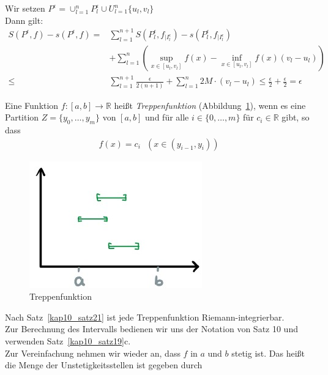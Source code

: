 \begin{Satz}
{	Wir setzen $P^{\epsilon} = \cup_{l = 1}^n P_l^{\epsilon}
	 \cup U_{l=1}^n\{u_l,v_l\}$\\
	 Dann gilt:
	 \begin{align*}
	 	S(P^{\epsilon},f) - s(P^{\epsilon},f) 
	 	= & \sum_{l=1}^{n+1} S(P_l^{\epsilon},f_{|I_l^{\epsilon}}) - 
	 		s(P_l^{\epsilon},f_{|I_l^{\epsilon}})  \\
	 		& + \sum_{l = 1}^n \left( \sup_{x \in [u_l, v_l]} 
	 		f(x) - \inf_{x \in [u_l, v_l]} f(x) (v_l - u_l)\right) \\
	 		\leq & \sum_{l=1}^{n+1} \frac{\epsilon}{2(n+1)} + \sum_{l=1}^n
	 			2M \cdot(v_l-u_l) \leq \frac{\epsilon}{2} + \frac{\epsilon}{2} 
	 			= \epsilon
	 \end{align*}	 
}\end{Satz}

\begin{Definition}{
	Eine Funktion $f: [a,b] \rightarrow \mathbb{R}$ heißt \emph{Treppenfunktion}
	 (Abbildung~\ref{plot_treppenfkt}), 
	wenn es 
	eine Partition $Z = \{ y_0, \hdots, y_m \}$ von $[a,b]$ und für alle 
	$i \in \{0, \hdots, m\}$ für $c_i \in \mathbb{R}$ gibt, so dass 
	\begin{align*}
		f(x) = c_i \text{ } ( x\in (y_{i-1},y_i))
	\end{align*}
	\begin{figure}
		\begin{center}
			\includegraphics[scale=0.5]{./skizzen/plot_treppenfkt}
		\end{center}
		\caption{Treppenfunktion}
		\label{plot_treppenfkt}
	\end{figure}
	Nach Satz~\ref{kap10_satz21}
	ist jede Treppenfunktion Riemann-integrierbar. \\
	Zur Berechnung des Intervalls bedienen wir uns der Notation von Satz 10 
	und verwenden Satz~\ref{kap10_satz19}c.\\
	Zur Vereinfachung nehmen wir wieder an, dass $f$ in $a$ und $b$ stetig ist. 
	Das heißt die Menge der Unstetigkeitsstellen ist gegeben durch 
}
\end{Definition}
